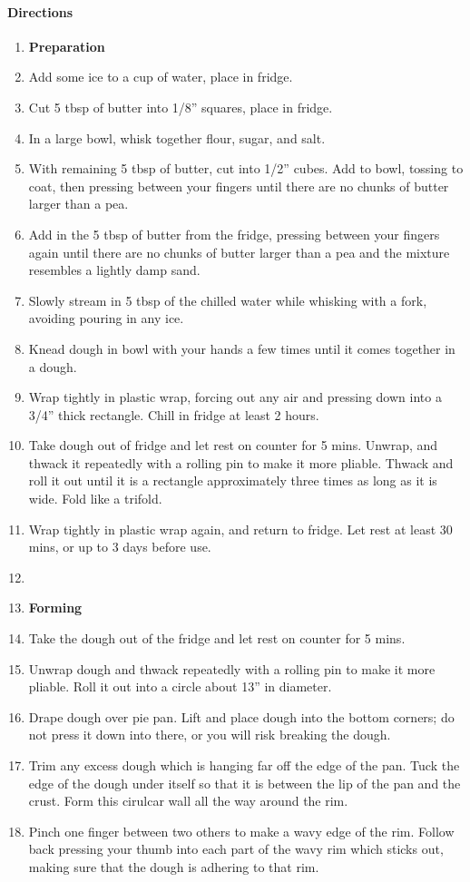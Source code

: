 \documentclass[12pt]{article}
\newenvironment*{directions}
	{
		\paragraph*{Directions}
		\begin{enumerate}
	}
	{
		\end{enumerate}
	}
\begin{document}
	\begin{directions}
		\item[] \textbf{Preparation}
		\item Add some ice to a cup of water, place in fridge.
		\item Cut 5 tbsp of butter into 1/8” squares, place in fridge.
		\item In a large bowl, whisk together flour, sugar, and salt.
		\item With remaining 5 tbsp of butter, cut into 1/2” cubes. Add to bowl, tossing to coat, then pressing between your fingers until there are no chunks of butter larger than a pea.
		\item Add in the 5 tbsp of butter from the fridge, pressing between your fingers again until there are no chunks of butter larger than a pea and the mixture resembles a lightly damp sand.
		\item Slowly stream in 5 tbsp of the chilled water while whisking with a fork, avoiding pouring in any ice.
		\item Knead dough in bowl with your hands a few times until it comes together in a dough.
		\item Wrap tightly in plastic wrap, forcing out any air and pressing down into a 3/4” thick rectangle. Chill in fridge at least 2 hours.
		\item Take dough out of fridge and let rest on counter for 5 mins. Unwrap, and thwack it repeatedly with a rolling pin to make it more pliable. Thwack and roll it out until it is a rectangle approximately three times as long as it is wide. Fold like a trifold.
		\item Wrap tightly in plastic wrap again, and return to fridge. Let rest at least 30 mins, or up to 3 days before use. \label{make_ahead:pie_crust}
		\item[] \hfill
		\item[] \textbf{Forming}
		\item Take the dough out of the fridge and let rest on counter for 5 mins.
		\item Unwrap dough and thwack repeatedly with a rolling pin to make it more pliable. Roll it out into a circle about 13” in diameter.
		\item Drape dough over pie pan. Lift and place dough into the bottom corners; do not press it down into there, or you will risk breaking the dough.
		\item Trim any excess dough which is hanging far off the edge of the pan. Tuck the edge of the dough under itself so that it is between the lip of the pan and the crust. Form this cirulcar wall all the way around the rim.
		\item Pinch one finger between two others to make a wavy edge of the rim. Follow back pressing your thumb into each part of the wavy rim which sticks out, making sure that the dough is adhering to that rim.
	\end{directions}
	
\end{document}
